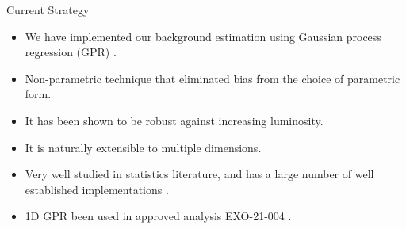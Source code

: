 \documentclass[10pt]{beamer}
\begin{document}

\begin{frame}{Current Strategy}
  \begin{itemize}
  \item We have implemented our background estimation using Gaussian process regression (GPR) \cite{rasmussen_gaussian_2006}.
  \item Non-parametric technique that eliminated bias from the choice of parametric form.
  \item It has been shown to be robust against increasing luminosity\cite{frate_modeling_2017}.
  \item It is naturally extensible to multiple dimensions.
  \item Very well studied in statistics literature\cite{rasmussen_gaussian_2006}, and has a large number of well established implementations \cite{noauthor_comparison_2024, gardner_gpytorch_2021}.
  \item 1D GPR been used in approved analysis EXO-21-004 \cite{cms_collaboration_searches_2024}.
  \end{itemize}
\end{frame}
\end{document}
